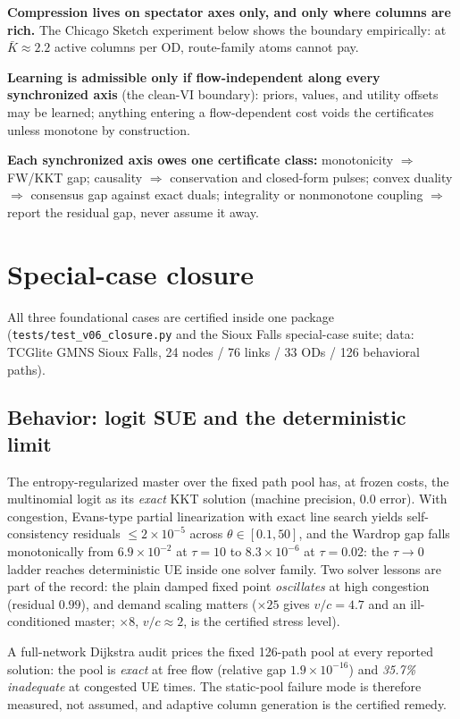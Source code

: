 \documentclass[11pt]{article}
\newcommand{\code}[1]{\texttt{#1}}
\begin{document}
\textbf{Compression lives on spectator axes only, and only where
columns are rich.} The Chicago Sketch experiment below shows the
boundary empirically: at $\bar K \approx 2.2$ active columns per OD,
route-family atoms cannot pay.

\textbf{Learning is admissible only if flow-independent along every
synchronized axis} (the clean-VI boundary): priors, values, and utility
offsets may be learned; anything entering a flow-dependent cost voids
the certificates unless monotone by construction.

\textbf{Each synchronized axis owes one certificate class:}
monotonicity $\Rightarrow$ FW/KKT gap; causality $\Rightarrow$
conservation and closed-form pulses; convex duality $\Rightarrow$
consensus gap against exact duals; integrality or nonmonotone coupling
$\Rightarrow$ report the residual gap, never assume it away.

\section{Special-case closure}

All three foundational cases are certified inside one package
(\code{tests/test\_v06\_closure.py} and the Sioux Falls special-case
suite; data: TCGlite GMNS Sioux Falls, 24 nodes / 76 links / 33 ODs /
126 behavioral paths).

\subsection{Behavior: logit SUE and the deterministic limit}

The entropy-regularized master over the fixed path pool has, at frozen
costs, the multinomial logit as its \emph{exact} KKT solution (machine
precision, $0.0$ error). With congestion, Evans-type partial
linearization with exact line search yields self-consistency residuals
$\le 2\times10^{-5}$ across $\theta \in [0.1, 50]$, and the Wardrop gap
falls monotonically from $6.9\times10^{-2}$ at $\tau{=}10$ to
$8.3\times10^{-6}$ at $\tau{=}0.02$: the $\tau \to 0$ ladder reaches
deterministic UE inside one solver family. Two solver lessons are part
of the record: the plain damped fixed point \emph{oscillates} at high
congestion (residual $0.99$), and demand scaling matters ($\times 25$
gives $v/c = 4.7$ and an ill-conditioned master; $\times 8$, $v/c
\approx 2$, is the certified stress level).

A full-network Dijkstra audit prices the fixed 126-path pool at every
reported solution: the pool is \emph{exact} at free flow (relative gap
$1.9\times10^{-16}$) and \emph{35.7\% inadequate} at congested UE
times. The static-pool failure mode is therefore measured, not
assumed, and adaptive column generation is the certified remedy.
\end{document}
